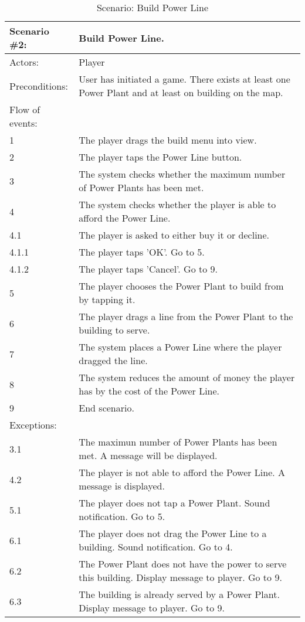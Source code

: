 \begin{table}
	\begin{tabular}{| l | p{10cm} |}
		\hline
		\rowcolor{lightgray}
		{\bf Scenario \#2:} & {\bf Build Power Line.} \\ \hline
		Actors: & Player \\ \hline
		Preconditions: & User has initiated a game. There exists at least one Power Plant and at least on building on the map. \\ \hline
		\rowcolor{lightergray}
		Flow of events: & \\ \hline
		1 & The player drags the build menu into view. \\ \hline
		2 & The player taps the Power Line button. \\ \hline
		3 & The system checks whether the maximum number of Power Plants has been met. \\ \hline
		4 & The system checks whether the player is able to afford the Power Line. \\ \hline
		4.1 & The player is asked to either buy it or decline. \\ \hline
		4.1.1 & The player taps 'OK'. Go to 5. \\ \hline
		4.1.2 & The player taps 'Cancel'. Go to 9. \\ \hline
		5 & The player chooses the Power Plant to build from by tapping it. \\ \hline
		6 & The player drags a line from the Power Plant to the building to serve. \\ \hline
		7 & The system places a Power Line where the player dragged the line. \\ \hline
		8 & The system reduces the amount of money the player has by the cost of the Power Line. \\ \hline
		9 & End scenario. \\ \hline
		\rowcolor{lightergray}
		Exceptions: & \\ \hline
		3.1 & The maximun number of Power Plants has been met. A message will be displayed. \\ \hline
		4.2 & The player is not able to afford the Power Line. A message is displayed. \\ \hline
		5.1 & The player does not tap a Power Plant. Sound notification. Go to 5. \\ \hline
		6.1 & The player does not drag the Power Line to a building. Sound notification. Go to 4. \\ \hline
		6.2 & The Power Plant does not have the power to serve this building. Display message to player. Go to 9. \\ \hline
		6.3 & The building is already served by a Power Plant. Display message to player. Go to 9. \\ \hline
	\end{tabular}
\caption{Scenario: Build Power Line}
\end{table}

